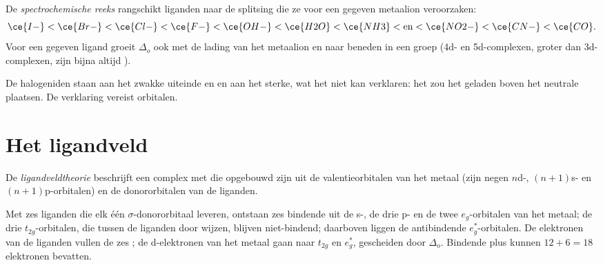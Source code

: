 \begin{definition}\label{def:b2:ligand-field:spectrochemical}
De \emph{spectrochemische reeks} rangschikt liganden naar de
splitsing die ze voor een gegeven metaalion veroorzaken:
\[
  \ce{I-} < \ce{Br-} < \ce{Cl-} < \ce{F-} < \ce{OH-} < \ce{H2O} < \ce{NH3} < \text{en} <
  \ce{NO2-} < \ce{CN-} < \ce{CO} .
\]
Voor een gegeven ligand groeit $\Delta_o$ ook met de lading van het metaalion en naar beneden in een groep
(4d- en 5d-complexen, groter dan 3d-complexen, zijn bijna altijd ).
\end{definition}

De halogeniden staan aan het zwakke uiteinde en  en  aan het sterke, wat het
 niet kan verklaren: het zou het geladen  boven het neutrale
 plaatsen. De verklaring vereist orbitalen.

\section{Het ligandveld}

\begin{definition}[Ligandveldtheorie]\label{def:b2:ligand-field:ligand-field}
De \emph{ligandveldtheorie} beschrijft een complex met 
die opgebouwd zijn uit de valentieorbitalen van het metaal (zijn negen $n$d-, $(n+1)$s- en $(n+1)$p-orbitalen)
en de donororbitalen van de liganden.
\end{definition}

\begin{proposition}\label{prop:b2:ligand-field:mo-octahedral}
Met zes liganden die elk één $\sigma$-donororbitaal leveren, ontstaan zes bindende 
uit de s-, de drie p- en de twee $e_g$-orbitalen van het metaal; de drie $t_{2g}$-orbitalen, die
tussen de liganden door wijzen, blijven niet-bindend; daarboven liggen de antibindende $e_g^*$-orbitalen.
De elektronen van de liganden vullen de zes ; de d-elektronen van het metaal gaan
naar $t_{2g}$ en $e_g^*$, gescheiden door $\Delta_o$. Bindende plus  kunnen
$12 + 6 = 18$ elektronen bevatten.
\end{proposition}

